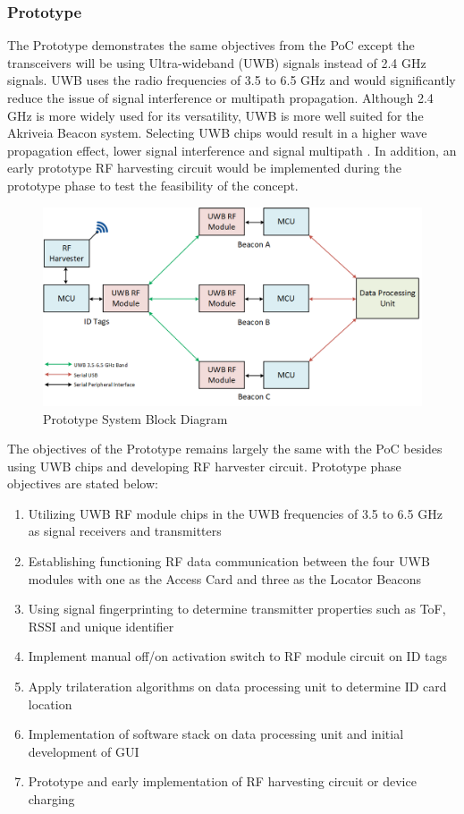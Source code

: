 \break
\subsubsection{Prototype}
\medskip
The Prototype demonstrates the same objectives from the PoC except the transceivers will be using Ultra-wideband (UWB) signals instead of 2.4 GHz signals. UWB uses the radio frequencies of 3.5 to 6.5 GHz and would significantly reduce the issue of signal interference or multipath propagation. Although 2.4 GHz is more widely used for its versatility, UWB is more well suited for the Akriveia Beacon system. Selecting UWB chips would result in a higher wave propagation effect, lower signal interference and signal multipath \cite{R4}. In addition, an early prototype RF harvesting circuit would be implemented during the prototype phase to test the feasibility of the concept.

\begin{figure}[h!]
    \centering
    \includegraphics[width=\linewidth]{./images/02_sys_Prototype.png}
    \caption{Prototype System Block Diagram}
    \label{fig:prototype_sys_blk}
\end{figure}
\bigskip

The objectives of the Prototype remains largely the same with the PoC besides using UWB
chips and developing RF harvester circuit. Prototype phase objectives are stated below:

\begin{enumerate}
    \item Utilizing UWB RF module chips in the UWB frequencies of 3.5 to 6.5 GHz as signal receivers and transmitters
    \item Establishing functioning RF data communication between the four UWB modules with one as the Access Card and three as the Locator Beacons
    \item Using signal fingerprinting to determine transmitter properties such as ToF, RSSI and unique identifier
    \item Implement manual off/on activation switch to RF module circuit on ID tags
    \item Apply trilateration algorithms on data processing unit to determine ID card location
    \item Implementation of software stack on data processing unit and initial development of GUI
    \item Prototype and early implementation of RF harvesting circuit or device charging
\end{enumerate}

